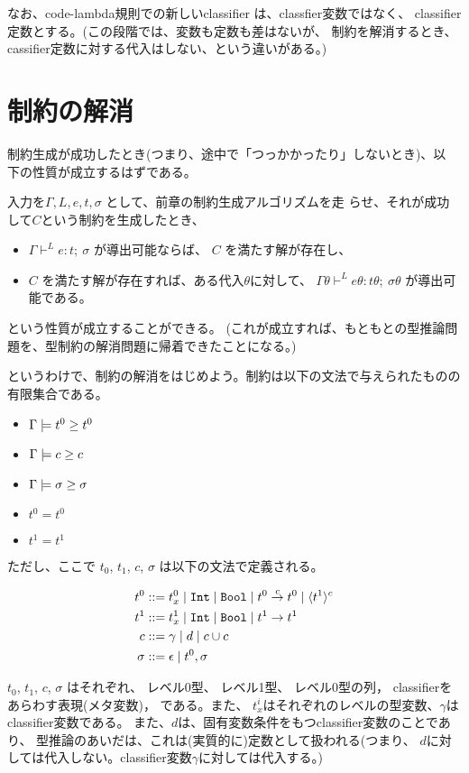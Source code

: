 なお、code-lambda規則での新しいclassifier は、classfier変数ではなく、
classifier定数とする。(この段階では、変数も定数も差はないが、
制約を解消するとき、cassifier定数に対する代入はしない、という違いがある。)

\chapter{制約の解消}

制約生成が成功したとき(つまり、途中で「つっかかったり」しないとき)、以
下の性質が成立するはずである。

入力を$\Gamma, L, e, t,\sigma$ として、前章の制約生成アルゴリズムを走
らせ、それが成功して$C$という制約を生成したとき、
\begin{itemize}
\item
  $\Gamma \vdash^L e: t; ~ \sigma$ が導出可能ならば、
  $C$ を満たす解が存在し、
\item
  $C$ を満たす解が存在すれば、ある代入$\theta$に対して、
  $\Gamma\theta \vdash^L e\theta: t\theta; ~ \sigma\theta$ が導出可能である。
\end{itemize}
という性質が成立することができる。
(これが成立すれば、もともとの型推論問題を、型制約の解消問題に帰着できたことになる。)

というわけで、制約の解消をはじめよう。制約は以下の文法で与えられたものの有限集合である。

\begin{itemize}
\item $\Gamma \models \longer{t^0}{t^0}$
\item $\Gamma \models \longer{c}{c}$
\item $\Gamma \models \longer{\sigma}{\sigma}$
\item $t^0=t^0$
\item $t^1=t^1$
\end{itemize}
ただし、ここで $t_0$, $t_1$, $c$, $\sigma$ は以下の文法で定義される。

\begin{align*}
  t^0      & ::= t^0_x \mid \Int \mid \Bool \mid \funT{t^0}{t^0}{c} \mid \codeT{t^1}{c} \\
  t^1      & ::= t^1_x \mid \Int \mid \Bool \mid \funT{t^1}{t^1}{} \\
  c        & ::= \gamma \mid d \mid c \uni c \\
  \sigma   & ::= \epsilon \mid t^0, \sigma
\end{align*}


$t_0$, $t_1$, $c$, $\sigma$ はそれぞれ、
レベル0型、
レベル1型、
レベル0型の列，
classifierをあらわす表現(メタ変数)，
である。また、
$t^i_x$はそれぞれのレベルの型変数、$\gamma$はclassifier変数である。
また、$d$は、固有変数条件をもつclassifier変数のことであり、
型推論のあいだは、これは(実質的に)定数として扱われる(つまり、
$d$に対しては代入しない。classifier変数$\gamma$に対しては代入する。)

